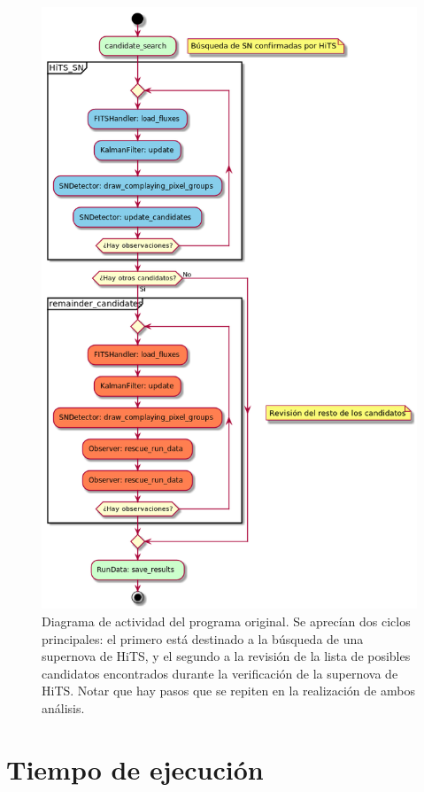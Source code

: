 \begin{figure}[h!]
\centering
\includegraphics[scale=.5]{images/results/sif_act}
\caption{Diagrama de actividad del programa original. Se aprec\'ian dos ciclos principales: el primero est\'a destinado a la b\'usqueda de una supernova de HiTS, y el segundo a la revisi\'on de la lista de posibles candidatos encontrados durante la verificaci\'on de la supernova de HiTS. Notar que hay pasos que se repiten en la realizaci\'on de ambos an\'alisis.}
\label{fig:des_sif}
\end{figure}

\section{Tiempo de ejecuci\'on}

